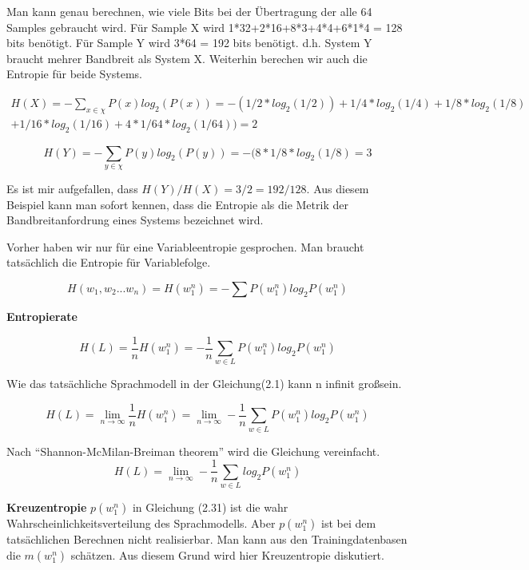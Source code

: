 Man kann genau berechnen, wie viele Bits bei der \"Ubertragung der alle 64 Samples gebraucht wird. F\"ur Sample X wird 1*32+2*16+8*3+4*4+6*1*4 = 128 bits ben\"otigt. F\"ur Sample Y wird 3*64 = 192 bits ben\"otigt. d.h. System Y braucht mehrer Bandbreit als System X. Weiterhin berechen wir auch die Entropie f\"ur beide Systems.

\begin{multline}
H(X)=-\sum_{x\in\chi}P(x)log_{2}(P(x))=-(1/2*log_{2}(1/2))+1/4*log_{2}(1/4)+1/8*log_{2}(1/8)\\
+1/16*log_{2}(1/16)+4*1/64*log_{2}(1/64))=2
\end{multline}

\begin{equation}
H(Y)=-\sum_{y\in\chi}P(y)log_{2}(P(y))=-(8*1/8*log_{2}(1/8)=3
\end{equation}

Es ist mir aufgefallen, dass $H(Y)/H(X)=3/2=192/128$. Aus diesem Beispiel kann man sofort kennen, dass die Entropie als die Metrik der Bandbreitanfordrung eines Systems bezeichnet wird.
   
Vorher haben wir nur f\"ur eine Variableentropie gesprochen. Man braucht tats\"achlich die Entropie f\"ur Variablefolge.

\begin{equation}
H(w_{1},w_{2}...w_{n})=H(w_{1}^{n})=-\sum{P(w_{1}^{n})log_{2}P(w_{1}^{n})}
\end{equation}

\textbf{Entropierate}

\begin{equation}
H(L)=\frac{1}{n}H(w_{1}^{n})=-\frac{1}{n}\sum_{w\in L}P(w_{1}^{n})log_{2}P(w_{1}^{n})
\end{equation}

Wie das tats\"achliche Sprachmodell in der Gleichung(2.1) kann n infinit gro\ss sein.

\begin{equation}
H(L)=\lim_{n\to\infty}\frac{1}{n}H(w_{1}^{n})=\lim_{n\to\infty}-\frac{1}{n}\sum_{w\in L}P(w_{1}^{n})log_{2}P(w_{1}^{n})
\end{equation}

Nach "`Shannon-McMilan-Breiman theorem"' wird die Gleichung vereinfacht.
\begin{equation}
H(L)=\lim_{n\to\infty}-\frac{1}{n}\sum_{w\in L}log_{2}P(w_{1}^{n})
\end{equation}

\textbf{Kreuzentropie}
$p(w_{1}^{n})$ in Gleichung (2.31) ist die wahr Wahrscheinlichkeitsverteilung des Sprachmodells. Aber $p(w_{1}^{n})$ ist bei dem tats\"achlichen Berechnen nicht realisierbar. Man kann aus den Trainingdatenbasen die $m(w_{1}^{n})$ sch\"atzen. Aus diesem Grund  wird hier Kreuzentropie diskutiert.

